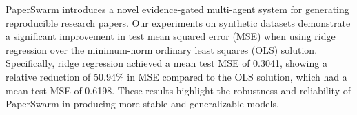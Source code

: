 PaperSwarm introduces a novel evidence-gated multi-agent system for generating reproducible research papers. Our experiments on synthetic datasets demonstrate a significant improvement in test mean squared error (MSE) when using ridge regression over the minimum-norm ordinary least squares (OLS) solution. Specifically, ridge regression achieved a mean test MSE of 0.3041, showing a relative reduction of 50.94\% in MSE compared to the OLS solution, which had a mean test MSE of 0.6198. These results highlight the robustness and reliability of PaperSwarm in producing more stable and generalizable models.
